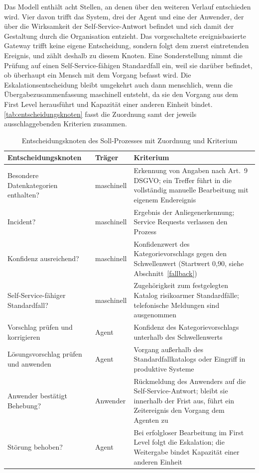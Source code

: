 Das Modell enth\"alt acht Stellen, an denen \"uber den weiteren Verlauf entschieden wird. Vier davon trifft das System, drei der Agent und eine der Anwender, der \"uber die Wirksamkeit der Self-Service-Antwort befindet und sich damit der Gestaltung durch die Organisation entzieht. Das vorgeschaltete ereignisbasierte Gateway trifft keine eigene Entscheidung, sondern folgt dem zuerst eintretenden Ereignis, und z\"ahlt deshalb zu diesem Knoten. Eine Sonderstellung nimmt die Pr\"ufung auf einen Self-Service-f\"ahigen Standardfall ein, weil sie dar\"uber befindet, ob \"uberhaupt ein Mensch mit dem Vorgang befasst wird. Die Eskalationsentscheidung bleibt umgekehrt auch dann menschlich, wenn die \"Ubergabezusammenfassung maschinell entsteht, da sie den Vorgang aus dem First Level heraus\-f\"uhrt und Kapazit\"at einer anderen Einheit bindet. \autoref{tab:entscheidungsknoten} fasst die Zuordnung samt der jeweils ausschlaggebenden Kriterien zusammen.

\begin{table}[!htb]
	\centering
	\caption{Entscheidungsknoten des Soll-Prozesses mit Zuordnung und Kriterium}
	\label{tab:entscheidungsknoten}
	\begin{tabularx}{\textwidth}{@{}p{4.6cm}p{2.1cm}X@{}}
		\toprule
		Entscheidungsknoten & Tr\"ager & Kriterium \\
		\midrule
		\glqq Besondere Datenkategorien enthalten?\grqq{} & maschinell & Erkennung von Angaben nach Art.~9 DSGVO; ein Treffer f\"uhrt in die vollst\"andig manuelle Bearbeitung mit eigenem Endereignis \\
		\glqq Incident?\grqq{} & maschinell & Ergebnis der Anliegenerkennung; Service Requests verlassen den Prozess \\
		\glqq Konfidenz ausreichend?\grqq{} & maschinell & Konfidenzwert des Kategorievorschlags gegen den Schwellenwert (Startwert 0,90, siehe Abschnitt~\ref{fallback}) \\
		\glqq Self-Service-f\"ahiger Standardfall?\grqq{} & maschinell & Zugeh\"origkeit zum festgelegten Katalog risikoarmer Standardf\"alle; telefonische Meldungen sind ausgenommen \\
		\glqq Vorschlag pr\"ufen und korrigieren\grqq{} & Agent & Konfidenz des Kategorievorschlags unterhalb des Schwellenwerts \\
		\glqq L\"osungsvorschlag pr\"ufen und anwenden\grqq{} & Agent & Vorgang au{\ss}erhalb des Standardfallkatalogs oder Eingriff in produktive Systeme \\
		\glqq Anwender best\"atigt Behebung?\grqq{} & Anwender & R\"uckmeldung des Anwenders auf die Self-Service-Antwort; bleibt sie innerhalb der Frist aus, f\"uhrt ein Zeitereignis den Vorgang dem Agenten zu \\
		\glqq St\"orung behoben?\grqq{} & Agent & Bei erfolgloser Bearbeitung im First Level folgt die Eskalation; die Weitergabe bindet Kapazit\"at einer anderen Einheit \\
		\bottomrule
	\end{tabularx}
\end{table}


